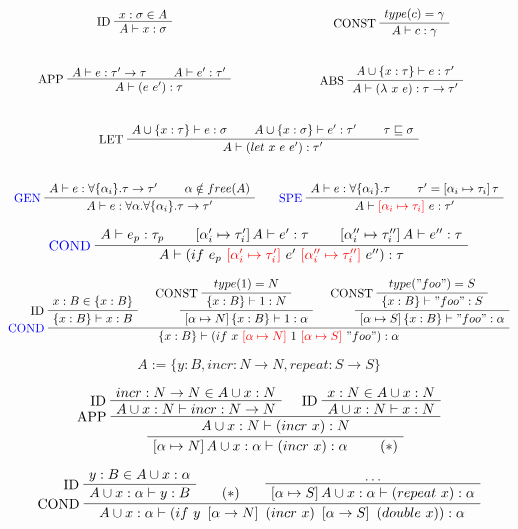 \documentclass[a4paper]{article}
\newcommand{\ax}[1]%
{\AxiomC{$#1$}}
\newcommand{\unc}[1]%
{\UnaryInfC{$#1$}}
\newcommand{\bic}[1]%
{\BinaryInfC{$#1$}}
\newcommand{\tric}[1]%
{\TrinaryInfC{$#1$}}
\newcommand{\llabel}[1]%
{\LeftLabel{#1}}
\newcommand{\drule}%
{\DisplayProof}
\begin{document}
$$\begin{array}{ccc}
\ax{x:\sigma\in A}
\llabel{ID}
\unc{A\vdash x:\sigma}
\drule
&&
\ax{type(c)=\gamma}
\llabel{CONST}
\unc{A\vdash c:\gamma}
\drule
\\\\\\
\ax{A\vdash e:\tau'\to\tau}
\ax{A\vdash e':\tau'}
\llabel{APP}
\bic{A\vdash (e\ e'):\tau}
\drule
&&
\ax{A\cup\{x:\tau\}\vdash e:\tau'}
\llabel{ABS}
\unc{A\vdash (\lambda\ x\ e):\tau\to\tau'}
\drule
\\\\\\
\multicolumn{3}{c}{
\ax{A\cup\{x:\tau\}\vdash e:\sigma}
\ax{A\cup\{x:\sigma\}\vdash e':\tau'}
\ax{\tau\sqsubseteq\sigma}
\llabel{LET}
\tric{A\vdash (let\ x\ e\ e'):\tau'}
\drule}
\\\\\\
\ax{A\vdash e:\forall\{\alpha_i\}.\tau\to\tau'}
\ax{\alpha\notin free(A)}
\llabel{\textcolor{blue}{GEN}}
\bic{A\vdash e:\forall\alpha.\forall\{\alpha_i\}.\tau\to\tau'}
\drule
&&
\ax{A\vdash e : \forall\{\alpha_i\}.\tau}
\ax{\tau' = \left[\alpha_i\mapsto\tau_i\right]\tau}
\llabel{\textcolor{blue}{SPE}}
\bic{A\vdash \textcolor{red}{\left[\alpha_i\mapsto\tau_i\right]}\ e:\tau'}
\drule
\end{array}$$

$$\ax{A\vdash e_p:\tau_p}
\ax{\left[\alpha'_i\mapsto\tau'_i\right]A\vdash e':\tau}
\ax{\left[\alpha''_i\mapsto\tau''_i\right]A\vdash e'':\tau}
\llabel{\textcolor{blue}{COND}}
\tric{A\vdash (if\ e_p\ \textcolor{red}{\left[\alpha'_i\mapsto\tau'_i\right]}\ e'\ \textcolor{red}{\left[\alpha''_i\mapsto\tau''_i\right]}\ e''):\tau}
\drule$$

$$\ax{x:B\in\{x:B\}}
\llabel{ID}
\unc{\{x:B\}\vdash x:B}
\ax{type(1)=N}
\llabel{CONST}
\unc{\{x:B\}\vdash 1:N}
\unc{\left[\alpha\mapsto N\right]\{x:B\}\vdash 1:\alpha}
\ax{type("foo")=S}
\llabel{CONST}
\unc{\{x:B\}\vdash "foo":S}
\unc{\left[\alpha\mapsto S\right]\{x:B\}\vdash "foo":\alpha}
\llabel{\textcolor{blue}{COND}}
\tric{\{x:B\}\vdash (if\ x\ \textcolor{red}{\left[\alpha\mapsto N\right]}\ 1\ \textcolor{red}{\left[\alpha\mapsto S\right]}\ "foo"):\alpha}
\drule$$

\newpage

$$A:=\{y:B,incr:N\to N, repeat:S\to S\}$$

$$
\ax{incr:N\to N \in A\cup x:N}
\llabel{ID}
\unc{A\cup x:N\vdash incr:N\to N}
\ax{x:N\in A\cup x:N}
\llabel{ID}
\unc{A\cup x:N\vdash x:N}
\llabel{APP}
\bic{A\cup x:N\vdash (incr\ x):N}
\unc{\left[\alpha\mapsto N\right]A\cup x:\alpha\vdash (incr\ x):\alpha~~~~~~~(*)}
\drule
$$

$$
\ax{y:B\in A\cup x:\alpha}
\llabel{ID}
\unc{A\cup x:\alpha \vdash y:B}
\ax{(*)}
\ax{\ldots}
\unc{\left[\alpha\mapsto S\right]A\cup x:\alpha\vdash (repeat\ x):\alpha}
\llabel{COND}
\tric{A\cup x:\alpha\vdash (if\ y\ \left[\alpha\to N\right]\ (incr\ x)\ \left[\alpha\to S\right]\ (double\ x)):\alpha}
\drule
$$
\end{document}
